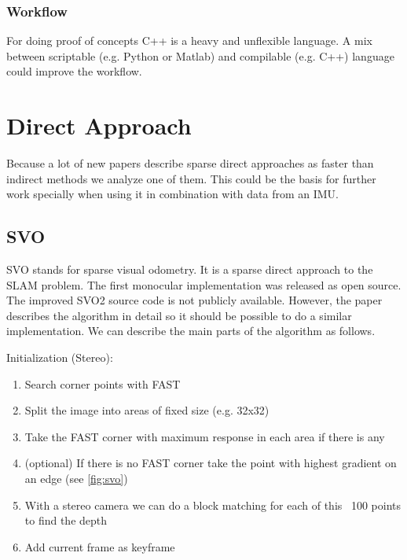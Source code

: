 \documentclass[11pt,a4paper,titlepage,oneside]{report}
\begin{document}
\subsection{Workflow}
For doing proof of concepts C++ is a heavy and unflexible language. A mix between scriptable (e.g. Python or Matlab) and compilable (e.g. C++) language could improve the workflow.

\chapter{Direct Approach}\label{chap:direct}
Because a lot of new papers describe sparse direct approaches as faster than indirect methods we analyze one of them. This could be the basis for further work specially when using it in combination with data from an IMU.

\section{SVO}

SVO \cite{svo} stands for sparse visual odometry. It is a sparse direct approach to the SLAM problem. The first monocular implementation was released as open source. The improved SVO2 source code is not publicly available. However, the paper describes the algorithm in detail so it should be possible to do a similar implementation. We can describe the main parts of the algorithm as follows.

Initialization (Stereo):
\begin{enumerate}
	\item Search corner points with FAST
	\item Split the image into areas of fixed size (e.g. 32x32)
	\item Take the FAST corner with maximum response in each area if there is any
	\item (optional) If there is no FAST corner take the point with highest gradient on an edge (see \ref{fig:svo})
	\item With a stereo camera we can do a block matching for each of this ~100 points to find the depth
	\item Add current frame as keyframe
\end{enumerate}
\end{document}
